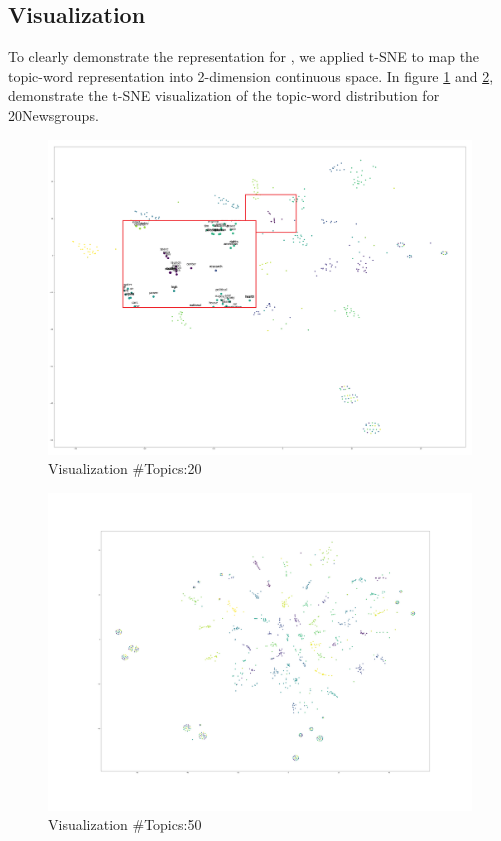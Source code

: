 \subsection{Visualization}
To clearly demonstrate the representation for , we applied t-SNE to map the topic-word representation into 2-dimension continuous space. In figure \ref{fig:tsne20t25w2} and \ref{fig:tsne50t25w0}, demonstrate the t-SNE visualization of the topic-word distribution for 20Newsgroups. 
\begin{figure}
\centering
\includegraphics[width=1\linewidth]{figures/0908/tsne_20t_25w_2}
\caption{Visualization \#Topics:20}
\label{fig:tsne20t25w2}
\end{figure}
\begin{figure}
\centering
\includegraphics[width=1\linewidth]{figures/0908/tsne_50t_25w_0}
\caption{Visualization \#Topics:50}
\label{fig:tsne50t25w0}
\end{figure}
